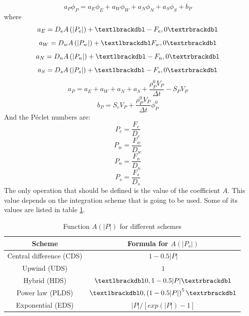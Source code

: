 \begin{equation}
	a_{P}\phi_{P}=a_{E}\phi_{E}+a_{W}\phi_{W}+a_{N}\phi_{N}+a_{S}\phi_{S}+b_{P}
\end{equation}
where
\begin{equation}
a_{E}=D_{e}A\left(|P_{e}|\right)+\textlbrackdbl-F_{e},0\textrbrackdbl
\end{equation}
\begin{equation}
a_{W}=D_{w}A\left(|P_{w}|\right)+\textlbrackdbl F_{w},0\textrbrackdbl
\end{equation}
\begin{equation}
a_{N}=D_{n}A\left(|P_{n}|\right)+\textlbrackdbl-F_{n},0\textrbrackdbl
\end{equation}
\begin{equation}
a_{S}=D_{s}A\left(|P_{s}|\right)+\textlbrackdbl-F_{s},0\textrbrackdbl
\end{equation}
\begin{equation}
a_{P}=a_{E}+a_{W}+a_{N}+a_{S}+\frac{\rho_{P}^{0}V_{P}}{\Delta t}-S_{P}V_{P}
\end{equation}
\begin{equation}
b_{P}=S_{c}V_{P}+\frac{\rho_{P}^{0}V_{P}}{\Delta t}\phi_{P}^{0}
\end{equation}
And the Péclet numbers are:
\begin{equation}
P_{e}=\frac{F_{e}}{D_{e}}
\end{equation}
\begin{equation}
P_{w}=\frac{F_{w}}{D_{w}}
\end{equation}
\begin{equation}
P_{n}=\frac{F_{n}}{D_{n}}
\end{equation}
\begin{equation}
P_{s}=\frac{F_{s}}{D_{s}}
\end{equation}
The only operation that should be defined is the value of the coefficient $A$. This value depends on the integration scheme that is going to be used. Some of its values are listed in table \ref{Patankarvalues}.
\begin{table}
	\centering
	\begin{tabular}{ |c|c| }
		\hline
		Scheme & Formula for $A\left(|P_{s}|\right)$ \\ \hline
		Central difference (CDS) & $1-0.5|P|$ \\ \hline
		Upwind (UDS) & $1$ \\ \hline
		Hybrid (HDS) & $\textlbrackdbl0,1-0.5|P|\textrbrackdbl$ \\ \hline
		Power law (PLDS) & $\textlbrackdbl0,\left(1-0.5|P|\right)^{5}\textrbrackdbl$ \\ \hline
		Exponential (EDS) & $|P|/\left[exp\left(|P|\right)-1\right]$ \\ \hline
	\end{tabular}
\caption{Function $A(|P|)$ for different schemes\cite{Patankar}}
\label{Patankarvalues}
\end{table}